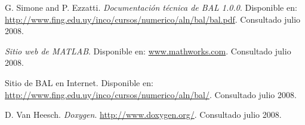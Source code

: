 \documentclass[a4paper,10pt]{article}
\begin{document}
\begin{thebibliography}{99}
 G. Simone and P. Ezzatti. \textit{Documentación técnica de BAL 1.0.0}.
Disponible en: \url{http://www.fing.edu.uy/inco/cursos/numerico/aln/bal/bal.pdf}. Consultado julio 2008.

 \textit{Sitio web de MATLAB}.
Disponible en: \url{www.mathworks.com}. Consultado julio 2008.

 Sitio de BAL en Internet.
Disponible en: \url{http://www.fing.edu.uy/inco/cursos/numerico/aln/bal/}. Consultado julio 2008.

 D. Van Heesch. \textit{Doxygen}. \url{http://www.doxygen.org/}. Consultado julio 2008.
\end{thebibliography}
\end{document}
